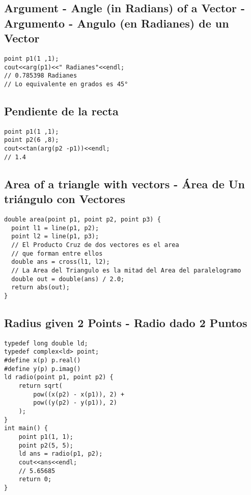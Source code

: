 \documentclass[10pt,letterpaper,twocolumn,twosided]{article}
\begin{document}
\subsection{Argument - Angle (in Radians) of a Vector - Argumento - Angulo (en Radianes) de un Vector}
\begin{lstlisting}
point p1(1 ,1);
cout<<arg(p1)<<" Radianes"<<endl;
// 0.785398 Radianes
// Lo equivalente en grados es 45°
\end{lstlisting}




\subsection{Pendiente de la recta}
\begin{lstlisting}
point p1(1 ,1);
point p2(6 ,8);
cout<<tan(arg(p2 -p1))<<endl;
// 1.4
\end{lstlisting}



\subsection{Area of a triangle with vectors - Área de Un triángulo con Vectores}
\begin{lstlisting}
double area(point p1, point p2, point p3) {
  point l1 = line(p1, p2);
  point l2 = line(p1, p3);
  // El Producto Cruz de dos vectores es el area
  // que forman entre ellos
  double ans = cross(l1, l2);
  // La Area del Triangulo es la mitad del Area del paralelogramo
  double out = double(ans) / 2.0;
  return abs(out);
}
\end{lstlisting}




\subsection{Radius given 2 Points - Radio dado 2 Puntos}
\begin{lstlisting}
typedef long double ld;
typedef complex<ld> point;
#define x(p) p.real()
#define y(p) p.imag()
ld radio(point p1, point p2) {
    return sqrt(
        pow((x(p2) - x(p1)), 2) +
        pow((y(p2) - y(p1)), 2)
    );
}
int main() {
    point p1(1, 1);
    point p2(5, 5);
    ld ans = radio(p1, p2);
    cout<<ans<<endl;
    // 5.65685
    return 0;
}
\end{lstlisting}
\end{document}

